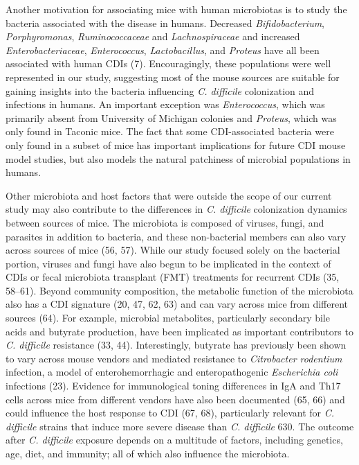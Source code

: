 \documentclass[
  11pt,
]{article}
\begin{document}
Another motivation for associating mice with human microbiotas is to
study the bacteria associated with the disease in humans. Decreased
\emph{Bifidobacterium}, \emph{Porphyromonas}, \emph{Ruminococcaceae} and
\emph{Lachnospiraceae} and increased \emph{Enterobacteriaceae},
\emph{Enterococcus}, \emph{Lactobacillus}, and \emph{Proteus} have all
been associated with human CDIs (7). Encouragingly, these populations
were well represented in our study, suggesting most of the mouse sources
are suitable for gaining insights into the bacteria influencing \emph{C.
difficile} colonization and infections in humans. An important exception
was \emph{Enterococcus}, which was primarily absent from University of
Michigan colonies and \emph{Proteus}, which was only found in Taconic
mice. The fact that some CDI-associated bacteria were only found in a
subset of mice has important implications for future CDI mouse model
studies, but also models the natural patchiness of microbial populations
in humans.

Other microbiota and host factors that were outside the scope of our
current study may also contribute to the differences in \emph{C.
difficile} colonization dynamics between sources of mice. The microbiota
is composed of viruses, fungi, and parasites in addition to bacteria,
and these non-bacterial members can also vary across sources of mice
(56, 57). While our study focused solely on the bacterial portion,
viruses and fungi have also begun to be implicated in the context of
CDIs or fecal microbiota transplant (FMT) treatments for recurrent CDIs
(35, 58--61). Beyond community composition, the metabolic function of
the microbiota also has a CDI signature (20, 47, 62, 63) and can vary
across mice from different sources (64). For example, microbial
metabolites, particularly secondary bile acids and butyrate production,
have been implicated as important contributors to \emph{C. difficile}
resistance (33, 44). Interestingly, butyrate has previously been shown
to vary across mouse vendors and mediated resistance to
\emph{Citrobacter rodentium} infection, a model of enterohemorrhagic and
enteropathogenic \emph{Escherichia coli} infections (23). Evidence for
immunological toning differences in IgA and Th17 cells across mice from
different vendors have also been documented (65, 66) and could influence
the host response to CDI (67, 68), particularly relevant for \emph{C.
difficile} strains that induce more severe disease than \emph{C.
difficile} 630. The outcome after \emph{C. difficile} exposure depends
on a multitude of factors, including genetics, age, diet, and immunity;
all of which also influence the microbiota.
\end{document}
